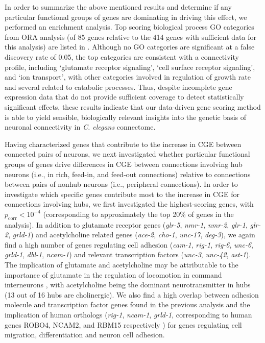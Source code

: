 \documentclass[10pt,letterpaper]{article}
\begin{document}
{In order to summarize the above mentioned results and determine if any particular functional groups of genes are dominating in driving this effect, we performed an enrichment analysis.
Top scoring biological process GO categories from ORA analysis (of 85 genes relative to the 414 genes with sufficient data for this analysis) are listed in .
Although no GO categories are significant at a false discovery rate of 0.05, the top categories are consistent with a connectivity profile, including `glutamate receptor signaling', `cell surface receptor signaling', and `ion transport', with other categories involved in regulation of growth rate and several related to catabolic processes.
Thus, despite incomplete gene expression data that do not provide sufficient coverage to detect statistically significant effects, these results indicate that our data-driven gene scoring method is able to yield sensible, biologically relevant insights into the genetic basis of neuronal connectivity in \textit{C. elegans} connectome.

Having characterized genes that contribute to the increase in CGE between connected pairs of neurons, we next investigated whether particular functional groups of genes drive differences in CGE between connections involving hub neurons (i.e., in rich, feed-in, and feed-out connections) relative to connections between pairs of nonhub neurons (i.e., peripheral connections).
In order to investigate which specific genes contribute most to the increase in CGE for connections involving hubs, we first investigated the highest-scoring genes, with $p_\mathrm{corr} < 10^{-4}$ (corresponding to approximately the top 20\% of genes in the analysis).
In addition to glutamate receptor genes (\emph{glr-5}, \emph{nmr-1}, \emph{nmr-2}, \emph{glr-1}, \emph{glr-2}, \emph{grld-1})
and acetylcholine related genes (\emph{ace-2}, \emph{cho-1}, \emph{unc-17}, \emph{deg-3}),
we again find a high number of genes regulating cell adhesion (\emph{cam-1}, \emph{rig-1}, \emph{rig-6}, \emph{unc-6}, \emph{grld-1}, \emph{dbl-1}, \emph{ncam-1})
and relevant transcription factors (\emph{unc-3}, \emph{unc-42}, \emph{ast-1}).
The implication of glutamate and acetylcholine may be attributable to the importance of glutamate in the regulation of locomotion in command interneurons \cite{Choi2015, Zheng1999}, with acetylcholine being the dominant neurotransmitter in hubs (13 out of 16 hubs are cholinergic).
We also find a high overlap between adhesion molecule and transcription factor genes found in the previous analysis and the implication of human orthologs (\emph{rig-1}, \emph{ncam-1}, \emph{grld-1}, corresponding to human genes ROBO4, NCAM2, and RBM15 respectively  \cite{Harris:2009kd}) for genes regulating cell migration, differentiation and neuron cell adhesion.


}
\end{document}

